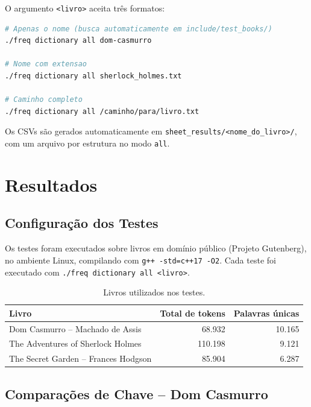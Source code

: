 \documentclass[12pt, a4paper]{article}
\begin{document}
O argumento \texttt{<livro>} aceita três formatos:

\begin{lstlisting}[language=bash]
# Apenas o nome (busca automaticamente em include/test_books/)
./freq dictionary all dom-casmurro

# Nome com extensao
./freq dictionary all sherlock_holmes.txt

# Caminho completo
./freq dictionary all /caminho/para/livro.txt
\end{lstlisting}

Os CSVs são gerados automaticamente em \texttt{sheet\_results/<nome\_do\_livro>/},
com um arquivo por estrutura no modo \texttt{all}.

\section{Resultados}

\subsection{Configuração dos Testes}

Os testes foram executados sobre livros em domínio público (Projeto Gutenberg),
no ambiente Linux, compilando com \texttt{g++ -std=c++17 -O2}. Cada teste foi
executado com \texttt{./freq dictionary all <livro>}.

\begin{table}[H]
\centering
\caption{Livros utilizados nos testes.}
\begin{tabular}{lrr}
\toprule
\textbf{Livro} & \textbf{Total de tokens} & \textbf{Palavras únicas} \\
\midrule
Dom Casmurro -- Machado de Assis       & 68.932  & 10.165 \\
The Adventures of Sherlock Holmes      & 110.198 & 9.121  \\
The Secret Garden -- Frances Hodgson     & 85.904  & 6.287  \\
\bottomrule
\end{tabular}
\end{table}

\subsection{Comparações de Chave -- Dom Casmurro}
\end{document}
